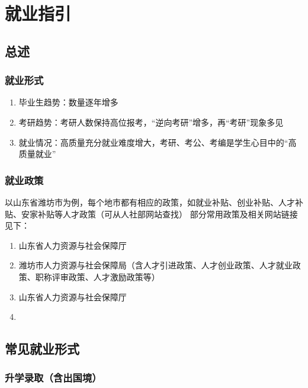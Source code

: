 \chapter[就业指引]{就业指引\footnotemark}

\section[总述]{总述}
\subsection[就业形式]{就业形式}
\begin{enumerate}
    \item 毕业生趋势：数量逐年增多
    \item 考研趋势：考研人数保持高位报考，“逆向考研”增多，再“考研”现象多见
    \item 就业情况：高质量充分就业难度增大，考研、考公、考编是学生心目中的“高质量就业”
\end{enumerate}

\subsection[就业政策]{就业政策}
以山东省潍坊市为例，每个地市都有相应的政策，如就业补贴、创业补贴、人才补贴、安家补贴等人才政策（可从人社部网站查找）
\bigbreak
部分常用政策及相关网站链接见下：
\begin{enumerate}
    \item 山东省人力资源与社会保障厅
    \item 潍坊市人力资源与社会保障局（含人才引进政策、人才创业政策、人才就业政策、职称评审政策、人才激励政策等）
    \item 山东省人力资源与社会保障厅
    \item {}
\end{enumerate}

\section[常见就业形式]{常见就业形式}
\subsection[升学录取（含出国境）]{升学录取（含出国境）}
